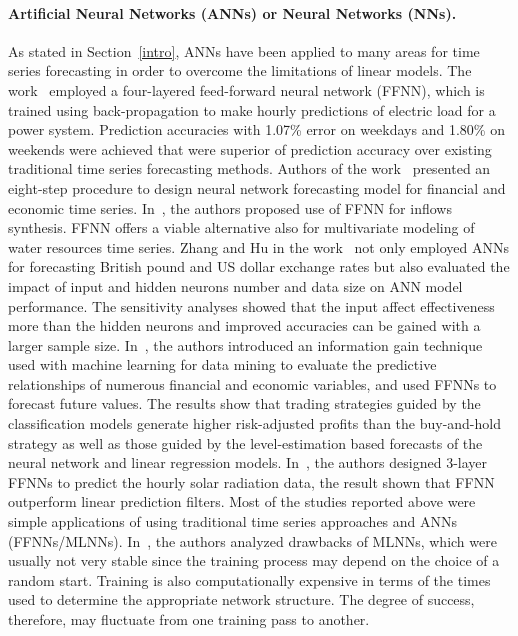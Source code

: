 \documentclass[smallcondensed, natbib]{svjour3}     %
\begin{document}
\paragraph{Artificial Neural Networks (ANNs) or Neural Networks (NNs).} As stated in Section~\ref{intro}, ANNs have been applied to many areas for time series forecasting in order to overcome the limitations of linear models. 
The work~\citep{ref_srinivasan} employed a four-layered feed-forward neural network (FFNN), which is trained using back-propagation to make hourly predictions of electric load for a power system. Prediction accuracies with 1.07\% error on weekdays and 1.80\% on weekends were achieved that were superior of prediction accuracy over existing traditional time series forecasting methods. 
Authors of the work~\citep{ref_kaastra} presented an eight-step procedure to design neural network forecasting model for financial and economic time series. 
In~\citep{ref_raman}, the authors proposed use of FFNN for inflows synthesis.
FFNN offers a viable alternative also for multivariate modeling of water resources time series. Zhang and Hu in the work~\citep{ref_zhang} not only employed ANNs for forecasting British pound and US dollar exchange rates but also evaluated the impact of input and hidden neurons number and data size on ANN model performance. The sensitivity analyses showed that the input affect effectiveness more than the hidden neurons and improved accuracies can be gained with a larger sample size. In~\citep{ref_enke}, the authors introduced an information gain technique used with machine learning for data mining to evaluate the predictive relationships of numerous financial and economic variables, and used FFNNs to forecast future values. The results show that trading strategies guided by the classification models generate higher risk-adjusted profits than the buy-and-hold strategy as well as those guided by the level-estimation based forecasts of the neural network and linear regression models. In~\citep{ref_hocaoglu}, the authors designed 3-layer FFNNs to predict the hourly solar radiation data, the result shown that FFNN outperform linear prediction filters. Most of the studies reported above were simple applications of using traditional time series approaches and ANNs (FFNNs/MLNNs). In~\citep{ref_enke}, the authors analyzed drawbacks of MLNNs, which were usually not very stable since the training process may depend on the choice of a random start. Training is also computationally expensive in terms of the times used to determine the appropriate network structure. The degree of success, therefore, may fluctuate from one training pass to another.
\end{document}
